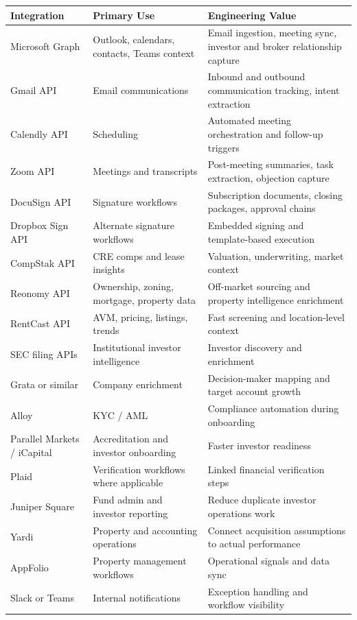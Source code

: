 \documentclass[11pt]{article}
\begin{document}
\begin{longtable}{p{} p{} p{}}
\toprule
\textbf{Integration} & \textbf{Primary Use} & \textbf{Engineering Value} \\
\midrule
Microsoft Graph & Outlook, calendars, contacts, Teams context & Email ingestion, meeting sync, investor and broker relationship capture \\
Gmail API & Email communications & Inbound and outbound communication tracking, intent extraction \\
Calendly API & Scheduling & Automated meeting orchestration and follow-up triggers \\
Zoom API & Meetings and transcripts & Post-meeting summaries, task extraction, objection capture \\
DocuSign API & Signature workflows & Subscription documents, closing packages, approval chains \\
Dropbox Sign API & Alternate signature workflows & Embedded signing and template-based execution \\
CompStak API & CRE comps and lease insights & Valuation, underwriting, market context \\
Reonomy API & Ownership, zoning, mortgage, property data & Off-market sourcing and property intelligence enrichment \\
RentCast API & AVM, pricing, listings, trends & Fast screening and location-level context \\
SEC filing APIs & Institutional investor intelligence & Investor discovery and enrichment \\
Grata or similar & Company enrichment & Decision-maker mapping and target account growth \\
Alloy & KYC / AML & Compliance automation during onboarding \\
Parallel Markets / iCapital & Accreditation and investor onboarding & Faster investor readiness \\
Plaid & Verification workflows where applicable & Linked financial verification steps \\
Juniper Square & Fund admin and investor reporting & Reduce duplicate investor operations work \\
Yardi & Property and accounting operations & Connect acquisition assumptions to actual performance \\
AppFolio & Property management workflows & Operational signals and data sync \\
Slack or Teams & Internal notifications & Exception handling and workflow visibility \\
\bottomrule
\end{longtable}
\end{document}
